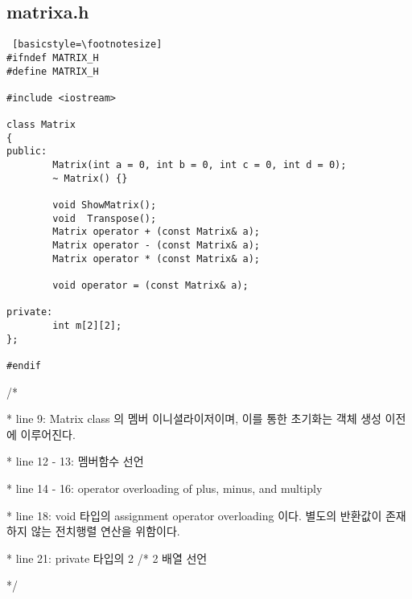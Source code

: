 \documentclass[twoside,twocolumn]{article}
\newenvironment{itemizeReduced}{
\begin{list}{\labelitemi}{\leftmargin=1em}
\setlength{\itemsep}{1pt}
\setlength{\parskip}{0pt}
\setlength{\parsep}{0pt}}{\end{list}
}
\begin{document}
\subsection{matrixa.h}
\begin{lstlisting} [basicstyle=\footnotesize]
#ifndef MATRIX_H
#define MATRIX_H

#include <iostream>

class Matrix
{
public:
        Matrix(int a = 0, int b = 0, int c = 0, int d = 0);
        ~ Matrix() {}

        void ShowMatrix();
        void  Transpose();
        Matrix operator + (const Matrix& a);
        Matrix operator - (const Matrix& a);
        Matrix operator * (const Matrix& a);

        void operator = (const Matrix& a);

private:
        int m[2][2];
};

#endif
\end{lstlisting}
\begin{itemizeReduced}
    \item[/*] 
    \item[*] line 9: Matrix class 의 멤버 이니셜라이저이며, 이를 통한 초기화는 객체 생성 이전에 이루어진다.
    \item[*] line 12 - 13: 멤버함수 선언
    \item[*] line 14 - 16: operator overloading of plus, minus, and multiply
    \item[*] line 18: void 타입의 assignment operator overloading 이다. 별도의 반환값이 존재하지 않는 전치행렬 연산을 위함이다.
    \item[*] line 21: private 타입의 2 /* 2 배열 선언
\end{itemizeReduced}
*/
\end{document}

